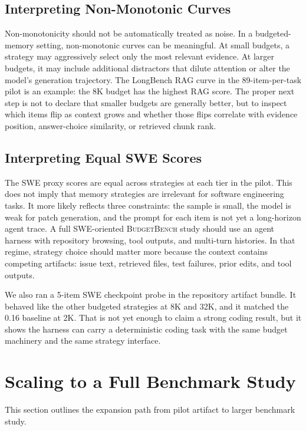 \documentclass[11pt]{article}
\newcommand{\BudgetBench}{\textsc{BudgetBench}}
\begin{document}
\subsection{Interpreting Non-Monotonic Curves}

Non-monotonicity should not be automatically treated as noise.  In a
budgeted-memory setting, non-monotonic curves can be meaningful.  At small
budgets, a strategy may aggressively select only the most relevant evidence.
At larger budgets, it may include additional distractors that dilute attention
or alter the model's generation trajectory.  The LongBench RAG curve in the
89-item-per-task pilot is an example: the 8K budget has the highest RAG score.  The
proper next step is not to declare that smaller budgets are generally better,
but to inspect which items flip as context grows and whether those flips
correlate with evidence position, answer-choice similarity, or retrieved chunk
rank.

\subsection{Interpreting Equal SWE Scores}

The SWE proxy scores are equal across strategies at each tier in the pilot.
This does not imply that memory strategies are irrelevant for software
engineering tasks.  It more likely reflects three constraints: the sample is
small, the model is weak for patch generation, and the prompt for each item is
not yet a long-horizon agent trace.  A full SWE-oriented \BudgetBench{} study
should use an agent harness with repository browsing, tool outputs, and
multi-turn histories.  In that regime, strategy choice should matter more
because the context contains competing artifacts: issue text, retrieved files,
test failures, prior edits, and tool outputs.

We also ran a 5-item SWE checkpoint probe in the repository artifact bundle.
It behaved like the other
budgeted strategies at 8K and 32K, and it matched the 0.16 baseline at 2K.
That is not yet enough to claim a strong coding result, but it shows the
harness can carry a deterministic coding task with the same budget machinery
and the same strategy interface.

\section{Scaling to a Full Benchmark Study}

This section outlines the expansion path from pilot artifact to larger
benchmark study.
\end{document}
